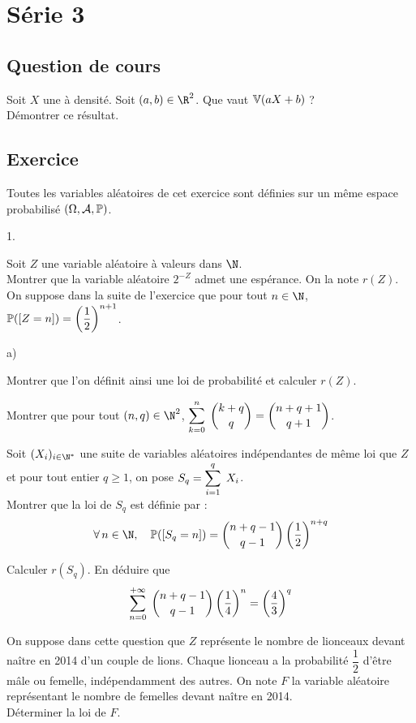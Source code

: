 \documentclass[11pt]{article}%
\begin{document}
\newpage
 
\section*{Série 3}
\subsection*{Question de cours}
\noindent
Soit $X$ une \var à densité. Soit $(a,b)\in\R^2$. Que vaut $\mathbb{V}(aX+b)$ 
?\\
Démontrer ce résultat.

\subsection*{Exercice} %
\noindent
Toutes les variables aléatoires de  cet exercice sont définies
sur un même espace probabilisé $(\Omega,{\cal A},\mathbb{P})$.

\begin{noliste}{1.}
\item
Soit $Z$ une variable al\'{e}atoire \`{a} valeurs dans $\N$.\\ 
Montrer
que la variable al\'{e}atoire $2^{-Z}$ admet une esp\'{e}rance. On la
note $r(Z)$.\\
On suppose dans la suite de l'exercice   que pour tout $n\in \N$,
$\mathbb{P}(\left[ {Z=n} \right])=  \left( \dfrac{1}{2} \right)^{n+1}$.

\item
\begin{noliste}{a)}
\item
Montrer que l'on d\'{e}finit ainsi une  loi de probabilit\'{e} et
calculer $r(Z)$.
\item
Montrer que pour tout $(n,q)\in \N^2$, $ \displaystyle\sum\limits_{k=0}^{n}\hspace{.1cm}
\dbinom{k+q}{ q}= \dbinom{n+q+1}{ q+1}$.
\item
Soit $(X_i)_{i\in\N^*}$ une suite de variables al\'{e}atoires
indépendantes de même loi que $Z$ et pour tout entier $q\geq 1$,
on pose
$S_q =
\displaystyle\sum\limits_{i=1}^{q}\hspace{.1cm} X_i$.\\
Montrer que la loi de $S_q$ est d\'{e}finie par :
\[
\forall\, n \in \N,  \quad \Prob(\Ev{S_q=n})= \dbinom{n+q-1}{q-1}\left(
\dfrac12\right)^{n+q}
\]
\item
Calculer $r(S_q)$. En d\'{e}duire que
\[
\displaystyle\sum\limits_{n=0}^{+\infty}\hspace{.1cm} \dbinom{n+q-1}{ q-1} \left(
\dfrac{1}{4}\right)^{n} = \left( \dfrac{4}{3}\right)^q
\]
\end{noliste}
\item
On suppose dans cette question  que $Z$ représente le nombre de
lionceaux devant naître en 2014 d'un couple de lions. Chaque
lionceau a la probabilité $\dfrac{1}{2}$ d'être mâle ou 
femelle,
indépendamment des autres. On note $F$ la variable aléatoire
représentant le nombre de femelles devant naître en 2014.\\
Déterminer la loi de $F$.
\end{noliste}
\end{document}
